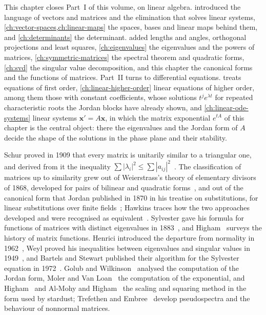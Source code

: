 This chapter closes Part~I of this volume, on linear algebra.  introduced the language of vectors and matrices and the elimination that solves linear systems, \cref{ch:vector-spaces,ch:linear-maps} the spaces, bases and linear maps behind them, and \cref{ch:determinants} the determinant.  added lengths and angles, orthogonal projections and least squares, \cref{ch:eigenvalues} the eigenvalues and the powers of matrices, \cref{ch:symmetric-matrices} the spectral theorem and quadratic forms, \cref{ch:svd} the singular value decomposition, and this chapter the canonical forms and the functions of matrices. Part~II turns to differential equations.  treats equations of first order, \cref{ch:linear-higher-order} linear equations of higher order, among them those with constant coefficients, whose solutions $t^je^{\lambda t}$ for repeated characteristic roots the Jordan blocks have already shown, and \cref{ch:linear-ode-systems} linear systems $\mathbf x'=A\mathbf x$, in which the matrix exponential $e^{tA}$ of this chapter is the central object: there the eigenvalues and the Jordan form of $A$ decide the shape of the solutions in the phase plane and their stability.

\chapternotes

Schur proved in 1909 that every matrix is unitarily similar to a triangular one, and derived from it the inequality $\sum|\lambda_i|^2\le\sum|a_{ij}|^2$~\cite{schur1909}. The classification of matrices up to similarity grew out of Weierstrass's theory of elementary divisors of 1868, developed for pairs of bilinear and quadratic forms~\cite{weierstrass1868}, and out of the canonical form that Jordan published in 1870 in his treatise on substitutions, for linear substitutions over finite fields~\cite{jordan1870}; Hawkins traces how the two approaches developed and were recognised as equivalent~\cite{hawkins1977}. Sylvester gave his formula for functions of matrices with distinct eigenvalues in 1883~\cite{sylvester1883}, and Higham~\cite[Chap.~1]{higham2008} surveys the history of matrix functions. Henrici introduced the departure from normality in 1962~\cite{henrici1962}, Weyl proved his inequalities between eigenvalues and singular values in 1949~\cite{weyl1949}, and Bartels and Stewart published their algorithm for the Sylvester equation in 1972~\cite{bartels1972}. Golub and Wilkinson~\cite{golubwilkinson1976} analysed the computation of the Jordan form, Moler and Van Loan~\cite{moler1978,moler2003} the computation of the exponential, and Higham~\cite{higham2005} and Al-Mohy and Higham~\cite{almohy2009} the scaling and squaring method in the form used by stardust; Trefethen and Embree~\cite{trefethen2005} develop pseudospectra and the behaviour of nonnormal matrices.

